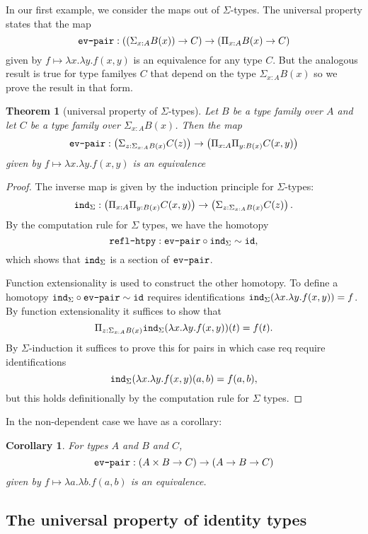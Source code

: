 \documentclass{amsart}
\theoremstyle{theorem}
\newtheorem*{thm}{Theorem}
\newtheorem*{cor}{Corollary}
\theoremstyle{definition}
\theoremstyle{remark}
\newcommand{\0}{\mathbbe{0}}
\newcommand{\1}{\mathbbe{1}}
\newcommand{\2}{\mathbbe{2}}
\newcommand{\3}{\mathbbe{3}}
\newcommand{\4}{\mathbbe{4}}
\newcommand{\term}[1]{{\textup{\texttt{#1}}}}
\newcommand{\id}{\term{id}}
\newcommand{\ind}{\term{ind}}
\begin{document}
In our first example, we consider the maps out of $\Sigma$-types. The universal property states that the map
\[ \term{ev-pair} : \left( \left( \Sigma_{x:A}B(x)\right) \to C \right) \to \left( \Pi_{x:A}B(x) \to C \right)\]
given by $f \mapsto \lambda x.\lambda y. f(x,y)$ is an equivalence for any type $C$. But the analogous result is true for type familyes $C$ that depend on the type $\Sigma_{x:A}B(x)$ so we prove the result in that form.

\begin{thm}[universal property of \texorpdfstring{$\Sigma$}{Sigma}-types]
Let $B$ be a type family over $A$ and let $C$ be a type family over $\Sigma_{x:A}B(x)$. Then the map 
\[ \term{ev-pair} : \left( \Sigma_{z: \Sigma_{x:A}B(x)} C(z) \right) \to \left( \Pi_{x:A}\Pi_{y:B(x)} C(x,y) \right)\]
given by $f \mapsto \lambda x.\lambda y. f(x,y)$ is an equivalence
\end{thm}
\begin{proof}
The inverse map is given by the induction principle for $\Sigma$-types:
\[ \ind_\Sigma : \left( \Pi_{x:A}\Pi_{y:B(x)} C(x,y) \right) \to \left( \Sigma_{z: \Sigma_{x:A}B(x)} C(z) \right) .\]
By the computation rule for $\Sigma$ types, we have the homotopy 
\[ \term{refl-htpy} : \term{ev-pair} \circ\ind_\Sigma \sim \id,\]
which shows that $\ind_\Sigma$ is a section of $\term{ev-pair}$.

Function extensionality is used to construct the other homotopy. To define a homotopy $\ind_\Sigma \circ \term{ev-pair} \sim \id$ requires identifications $\ind_\Sigma(\lambda x. \lambda y. f(x,y)) = f$. By function extensionality it suffices to show that
\[ \Pi_{z: \Sigma_{x:A}B(x)} \ind_\Sigma(\lambda x. \lambda y. f(x,y))(t) = f(t).\] By $\Sigma$-induction it suffices to prove this for pairs in which case req require identifications
\[ \ind_\Sigma(\lambda x. \lambda y. f(x,y)(a,b) = f(a,b),\]
but this holds definitionally by the computation rule for $\Sigma$ types.
\end{proof}

In the non-dependent case we have as a corollary:

\begin{cor} For types $A$ and $B$ and $C$,
\[ \term{ev-pair} : (A \times B \to C) \to (A \to B \to C)\]
given by $f \mapsto \lambda a. \lambda b. f(a,b)$ is an equivalence.
\end{cor}

\subsection*{The universal property of identity types}
\end{document}
